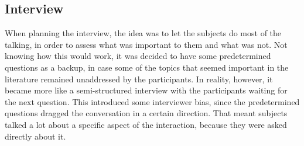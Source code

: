 \subsection{Interview}
When planning the interview, the idea was to let the subjects do most of the talking, in order to assess what was important to them and what was not. Not knowing how this would work, it was decided to have some predetermined questions as a backup, in case some of the topics that seemed important in the literature remained unaddressed by the participants. In reality, however, it became more like a semi-structured interview with the participants waiting for the next question. This introduced some interviewer bias, since the predetermined questions dragged the conversation in a certain direction. That meant subjects talked a lot about a specific aspect of the interaction, because they were asked directly about it.
